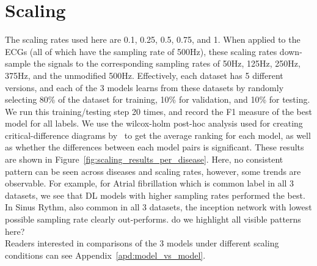 \documentclass[pmlr,twocolumn]{jmlr}%
\begin{document}
\section{Scaling}
\label{sec:scaling}
The scaling rates used here are 0.1, 0.25, 0.5, 0.75, and 1. When applied to the ECGs (all of which have the sampling rate of 500Hz), these scaling rates down-sample the signals to the corresponding sampling rates of 50Hz, 125Hz, 250Hz, 375Hz, and the unmodified 500Hz. Effectively, each dataset has 5 different versions, and each of the 3 models learns from these datasets by randomly selecting 80\% of the dataset for training, 10\% for validation, and 10\% for testing. We run this training/testing step 20 times, and record the F1 measure of the best model for all labels. We use the wilcox-holm post-hoc analysis used for creating critical-difference diagrams by~\cite{IsmailFawaz2018deep} to get the average ranking for each model, as well as whether the differences between each model pairs is significant. These results are shown in Figure~\ref{fig:scaling_results_per_disease}. Here, no consistent pattern can be seen across diseases and scaling rates, however, some trends are observable. For example, for Atrial fibrillation which is common label in all 3 datasets, we see that DL models with higher sampling rates performed the best. In Sinus Rythm, also common in all 3 datasets, the inception network with lowest possible sampling rate clearly out-performs. {\color{red} do we highlight all visible patterns here?}\\

Readers interested in comparisons of the 3 models under different scaling conditions can see Appendix~\ref{apd:model_vs_model}. 




\appendix
\end{document}
